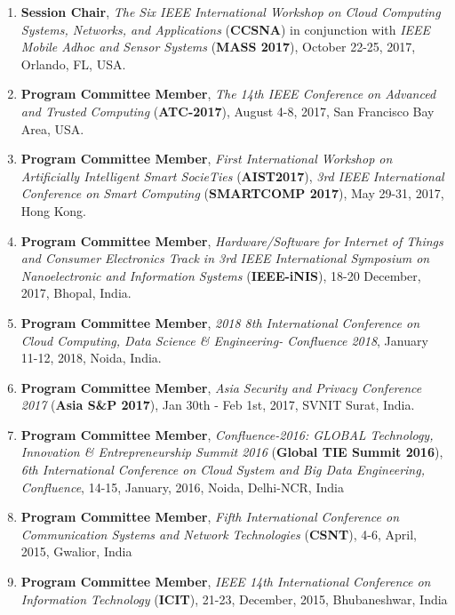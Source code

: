 \begin{enumerate} [label=(\arabic*).]
\item
\textbf{Session Chair}, \textit{The Six IEEE International Workshop on Cloud Computing Systems, Networks, and Applications }(\textbf{CCSNA}) in conjunction with \textit{IEEE Mobile Adhoc and Sensor Systems} (\textbf{MASS 2017}), October 22-25, 2017, Orlando, FL, USA.%

\item
\textbf{Program Committee Member}, \textit{The 14th IEEE Conference on Advanced and Trusted Computing} (\textbf{ATC-2017}), August 4-8, 2017, San Francisco Bay Area, USA. %

\item
\textbf{Program Committee Member}, \textit{First International Workshop on Artificially Intelligent Smart SocieTies} (\textbf{AIST2017}), \textit{3rd IEEE International Conference on Smart Computing} (\textbf{SMARTCOMP 2017}), May 29-31, 2017, Hong Kong.

\item
\textbf{Program Committee Member},\textit{ Hardware/Software for Internet of Things and Consumer Electronics Track in 3rd IEEE International Symposium on Nanoelectronic and Information Systems} (\textbf{IEEE-iNIS}), 18-20 December, 2017, Bhopal, India.

\item
\textbf{Program Committee Member}, \textit{2018 8th International Conference on Cloud Computing, Data Science \& Engineering- Confluence 2018}, January 11-12, 2018, Noida, India.

\item
\textbf{Program Committee Member}, \textit{Asia Security and Privacy Conference 2017} (\textbf{Asia S\&P 2017}), Jan 30th - Feb 1st, 2017, SVNIT Surat, India.

\item
\textbf{Program Committee Member},  \textit{Confluence-2016: GLOBAL Technology, Innovation \& Entrepreneurship Summit 2016 }(\textbf{Global TIE Summit 2016}),\textit{ 6th International Conference on Cloud System and Big Data Engineering, Confluence}, 14-15, January, 2016, Noida, Delhi-NCR, India

\item
\textbf{Program Committee Member},  \textit{Fifth International Conference on Communication Systems and Network Technologies }(\textbf{CSNT}), 4-6, April, 2015, Gwalior, India

\item
\textbf{Program Committee Member}, \textit{IEEE 14th International Conference on Information Technology} (\textbf{ICIT}), 21-23, December, 2015, Bhubaneshwar, India


\end{enumerate}
